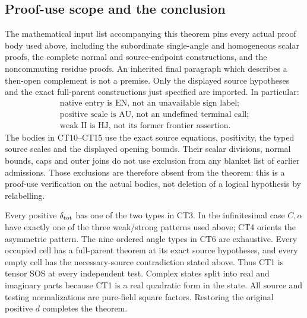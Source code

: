 \subsection{Proof-use scope and the conclusion}

The mathematical input list accompanying this theorem pins
every actual proof body used above, including the subordinate
single-angle and homogeneous scalar proofs, the complete normal
and source-endpoint constructions, and the noncommuting residue proofs.
An inherited final paragraph which describes a then-open
complement is not a premise.  Only the displayed source
hypotheses and the exact full-parent constructions just
specified are imported.
In particular:
\[
\begin{gathered}
 \text{native entry is EN, not an unavailable sign label;}\\
 \text{positive scale is AU, not an undefined terminal call;}\\
 \text{weak II is HJ, not its former frontier assertion.}
\end{gathered}\tag{CT16}
\]
The bodies in CT10--CT15 use the exact source equations,
positivity, the typed source scales and the displayed
opening bounds.  Their scalar divisions, normal bounds,
caps and outer joins do not use exclusion from any
blanket list of earlier admissions.
Those exclusions are therefore absent from the theorem:
this is a proof-use verification on the actual bodies,
not deletion of a logical hypothesis by relabelling.

Every positive \(\delta_{\rm tot}\) has one of the two
types in CT3.  In the infinitesimal case \(C,\alpha\)
have exactly one of the three weak/strong patterns
used above; CT4 orients the asymmetric pattern.
The nine ordered angle types in CT6 are exhaustive.
Every occupied cell has a full-parent theorem at its
exact source hypotheses, and every empty cell has the
necessary-source contradiction stated above.
Thus CT1 is tensor SOS at every independent test.
Complex states split into real and imaginary parts
because CT1 is a real quadratic form in the state.
All source and testing normalizations are pure-field
square factors.  Restoring the original positive \(d\)
completes the theorem.
